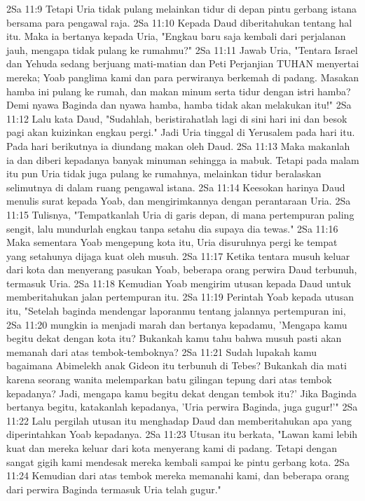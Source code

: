 2Sa 11:9  Tetapi Uria tidak pulang melainkan tidur di depan pintu gerbang istana bersama para pengawal raja.
2Sa 11:10  Kepada Daud diberitahukan tentang hal itu. Maka ia bertanya kepada Uria, "Engkau baru saja kembali dari perjalanan jauh, mengapa tidak pulang ke rumahmu?"
2Sa 11:11  Jawab Uria, "Tentara Israel dan Yehuda sedang berjuang mati-matian dan Peti Perjanjian TUHAN menyertai mereka; Yoab panglima kami dan para perwiranya berkemah di padang. Masakan hamba ini pulang ke rumah, dan makan minum serta tidur dengan istri hamba? Demi nyawa Baginda dan nyawa hamba, hamba tidak akan melakukan itu!"
2Sa 11:12  Lalu kata Daud, "Sudahlah, beristirahatlah lagi di sini hari ini dan besok pagi akan kuizinkan engkau pergi." Jadi Uria tinggal di Yerusalem pada hari itu. Pada hari berikutnya ia diundang makan oleh Daud.
2Sa 11:13  Maka makanlah ia dan diberi kepadanya banyak minuman sehingga ia mabuk. Tetapi pada malam itu pun Uria tidak juga pulang ke rumahnya, melainkan tidur beralaskan selimutnya di dalam ruang pengawal istana.
2Sa 11:14  Keesokan harinya Daud menulis surat kepada Yoab, dan mengirimkannya dengan perantaraan Uria.
2Sa 11:15  Tulisnya, "Tempatkanlah Uria di garis depan, di mana pertempuran paling sengit, lalu mundurlah engkau tanpa setahu dia supaya dia tewas."
2Sa 11:16  Maka sementara Yoab mengepung kota itu, Uria disuruhnya pergi ke tempat yang setahunya dijaga kuat oleh musuh.
2Sa 11:17  Ketika tentara musuh keluar dari kota dan menyerang pasukan Yoab, beberapa orang perwira Daud terbunuh, termasuk Uria.
2Sa 11:18  Kemudian Yoab mengirim utusan kepada Daud untuk memberitahukan jalan pertempuran itu.
2Sa 11:19  Perintah Yoab kepada utusan itu, "Setelah baginda mendengar laporanmu tentang jalannya pertempuran ini,
2Sa 11:20  mungkin ia menjadi marah dan bertanya kepadamu, 'Mengapa kamu begitu dekat dengan kota itu? Bukankah kamu tahu bahwa musuh pasti akan memanah dari atas tembok-temboknya?
2Sa 11:21  Sudah lupakah kamu bagaimana Abimelekh anak Gideon itu terbunuh di Tebes? Bukankah dia mati karena seorang wanita melemparkan batu gilingan tepung dari atas tembok kepadanya? Jadi, mengapa kamu begitu dekat dengan tembok itu?' Jika Baginda bertanya begitu, katakanlah kepadanya, 'Uria perwira Baginda, juga gugur!'"
2Sa 11:22  Lalu pergilah utusan itu menghadap Daud dan memberitahukan apa yang diperintahkan Yoab kepadanya.
2Sa 11:23  Utusan itu berkata, "Lawan kami lebih kuat dan mereka keluar dari kota menyerang kami di padang. Tetapi dengan sangat gigih kami mendesak mereka kembali sampai ke pintu gerbang kota.
2Sa 11:24  Kemudian dari atas tembok mereka memanahi kami, dan beberapa orang dari perwira Baginda termasuk Uria telah gugur."

